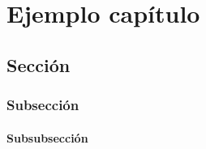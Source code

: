 \chapter{Ejemplo capítulo} \label{sec2}

\section{Sección}

\subsection{Subsección} \label{subsec}

\subsubsection{Subsubsección}
